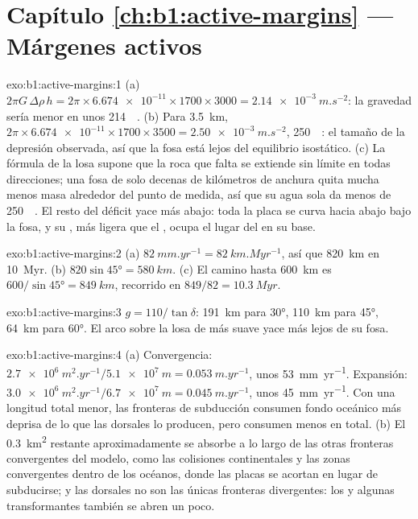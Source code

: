 \section*{Capítulo \ref{ch:b1:active-margins} --- Márgenes activos}

\begin{solution}{exo:b1:active-margins:1}
(a) $2\pi G\,\Delta\rho\,h = 2\pi\times\num{6.674e-11}\times1700\times3000 =
\qty{2.14e-3}{m.s^{-2}}$: la gravedad sería menor en unos
\qty{214}{\milli\gal}. (b) Para \qty{3.5}{km},
$2\pi\times\num{6.674e-11}\times1700\times3500 = \qty{2.50e-3}{m.s^{-2}}$,
\qty{250}{\milli\gal}: el tamaño de la depresión observada, así que la fosa está lejos del equilibrio isostático. (c) La fórmula de la losa supone que la roca que falta
se extiende sin límite en todas direcciones; una fosa de solo decenas de kilómetros de anchura quita mucha menos masa alrededor del punto de medida, así que
su agua sola da menos de \qty{250}{\milli\gal}. El resto del déficit yace más abajo: toda la placa se curva hacia abajo bajo la fosa, y su , más
ligera que el , ocupa el lugar del  en su base.
\end{solution}

\begin{solution}{exo:b1:active-margins:2}
(a) $\qty{82}{mm.yr^{-1}} = \qty{82}{km.Myr^{-1}}$, así que \qty{820}{km} en
\qty{10}{Myr}. (b) $820\sin\ang{45} = \qty{580}{km}$. (c) El camino hasta
\qty{600}{km} es $600/\sin\ang{45} = \qty{849}{km}$, recorrido en
$849/82 = \qty{10.3}{Myr}$.
\end{solution}

\begin{solution}{exo:b1:active-margins:3}
$g = 110/\tan\delta$: \qty{191}{km} para \ang{30}, \qty{110}{km} para \ang{45},
\qty{64}{km} para \ang{60}. El arco sobre la losa de  más suave yace más lejos
de su fosa.
\end{solution}

\begin{solution}{exo:b1:active-margins:4}
(a) Convergencia: $\qty{2.7e6}{m^2.yr^{-1}}/\qty{5.1e7}{m} =
\qty{0.053}{m.yr^{-1}}$, unos \qty{53}{mm.yr^{-1}}. Expansión:
$\qty{3.0e6}{m^2.yr^{-1}}/\qty{6.7e7}{m} = \qty{0.045}{m.yr^{-1}}$, unos
\qty{45}{mm.yr^{-1}}. Con una longitud total menor, las fronteras de subducción consumen fondo oceánico más deprisa de lo que las dorsales lo producen, pero consumen menos en total.
(b) El \qty{0.3}{km^2} restante aproximadamente se absorbe a lo largo de las otras fronteras convergentes del modelo, como las colisiones continentales y las zonas convergentes dentro de los océanos, donde las placas se acortan en lugar de subducirse; y las dorsales no son las únicas fronteras divergentes: los  y algunas transformantes también se abren un poco.
\end{solution}

